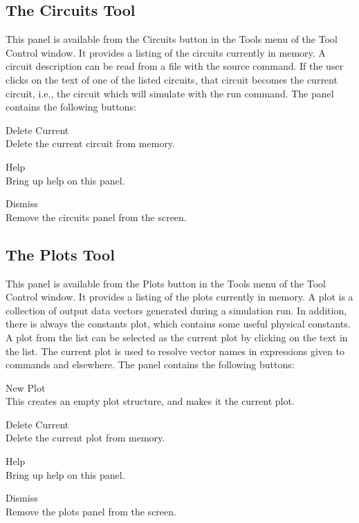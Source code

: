 \subsection{The Circuits Tool}
\label{circuitspanel}

This panel is available from the {\cb Circuits} button in the {\cb
Tools} menu of the {\cb Tool Control} window.  It provides a listing
of the circuits currently in memory.  A circuit description can be
read from a file with the {\cb source} command.  If the user clicks on
the text of one of the listed circuits, that circuit becomes the
current circuit, i.e., the circuit which will simulate with the {\cb
run} command.  The panel contains the following buttons:

\begin{description}
\item{\cb Delete Current}\\
    Delete the current circuit from memory.
\item{\cb Help}\\
    Bring up help on this panel.
\item{\cb Dismiss}\\
    Remove the circuits panel from the screen.
\end{description}

\subsection{The Plots Tool}
\label{plotspanel}

This panel is available from the {\cb Plots} button in the {\cb Tools}
menu of the {\cb Tool Control} window.  It provides a listing of the
plots currently in memory.  A plot is a collection of output data
vectors generated during a simulation run.  In addition, there is
always the {\vt constants} plot, which contains some useful physical
constants.  A plot from the list can be selected as the current plot
by clicking on the text in the list.  The current plot is used to
resolve vector names in expressions given to commands and elsewhere. 
The panel contains the following buttons:

\begin{description}
\item{\cb New Plot}\\
    This creates an empty plot structure, and makes it the current
    plot.
\item{\cb Delete Current}\\
    Delete the current plot from memory.
\item{\cb Help}\\
    Bring up help on this panel.
\item{\cb Dismiss}\\
    Remove the plots panel from the screen.
\end{description}

